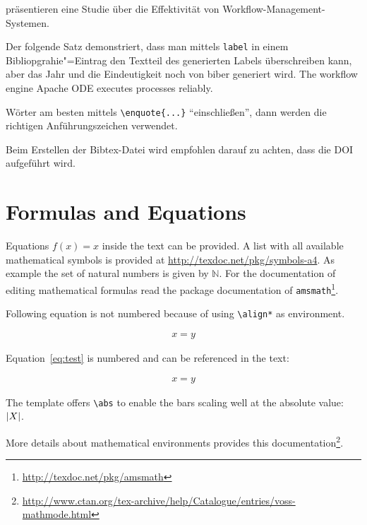 
 präsentieren eine Studie über die Effektivität von Workflow-Management-Systemen.

Der folgende Satz demonstriert, dass man mittels \texttt{label} in einem Bibliopgrahie"=Eintrag den Textteil des generierten Labels überschreiben kann, aber das Jahr und die Eindeutigkeit noch von biber generiert wird.
The workflow engine Apache ODE \cite{ApacheODE} executes \BPEL processes reliably.

Wörter am besten mittels \texttt{\textbackslash enquote\{...\}} \enquote{einschließen}, dann werden die richtigen Anführungszeichen verwendet.

Beim Erstellen der Bibtex-Datei wird empfohlen darauf zu achten, dass die DOI aufgeführt wird.

\section{Formulas and Equations}
\label{sec:mf}
Equations $f(x)=x$ inside the text can be provided.
A list with all available mathematical symbols is provided at \url{http://texdoc.net/pkg/symbols-a4}.
As example the set of natural numbers is given by $\mathbb{N}$.
For the documentation of editing mathematical formulas read the package documentation of \texttt{amsmath}\footnote{\url{http://texdoc.net/pkg/amsmath}}.

Following equation is not numbered because of using \texttt{\textbackslash align*} as environment.
\begin{filecontents*}{\democodefile}
\begin{align*}
  x = y
\end{align*}
\end{filecontents*}


Equation~\ref{eq:test} is numbered and can be referenced in the text:
\begin{filecontents*}{\democodefile}
\begin{align}
  \label{eq:test}
  x = y
\end{align}
\end{filecontents*}


The template offers \verb+\abs+ to enable the bars scaling well at the absolute value:
$\left\lvert X\right\rvert$.

More details about mathematical environments provides this documentation\footnote{\url{http://www.ctan.org/tex-archive/help/Catalogue/entries/voss-mathmode.html}}.


